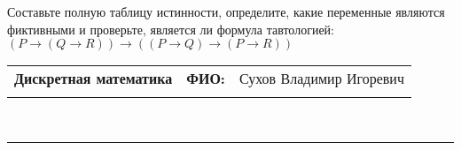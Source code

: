 \documentclass[10pt]{exam}
\newcommand{\class}{Дискретная математика}
\newcommand{\examdate}{}
\begin{document}
\begin{questions}
\begin{enumerate} [a)]
\end{enumerate}\question Составьте полную таблицу истинности, определите, какие переменные являются фиктивными и проверьте, является ли формула тавтологией:
$(P \rightarrow (Q \rightarrow R)) \rightarrow ((P \rightarrow Q) \rightarrow (P \rightarrow R))$

\end{questions}
\newpage
\begin{flushright}
\begin{tabular}{p{2.8in} r l}
\textbf{\class} & \textbf{ФИО:} &Сухов Владимир Игоревич
\\

\textbf{\examdate} &&\\
\end{tabular}\\
\end{flushright}
\rule[1ex]{\textwidth}{.1pt}
\end{document}
